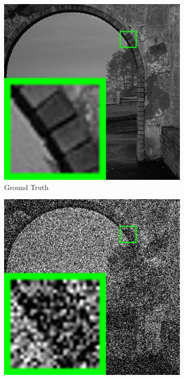 \begin{figure}
    \centering
    \begin{subfigure}[t]{0.24\textwidth}
        \centering
        \includegraphics[width=1\textwidth]{images/pgpd/200img/br_5096.jpg}
	   \caption{Ground Truth}
    \end{subfigure}
    \hfill
    \begin{subfigure}[t]{0.24\textwidth}
        \centering
        \includegraphics[width=1\textwidth]{images/pgpd/200img/br_75_5096.jpg}

\end{subfigure}
\end{figure}
